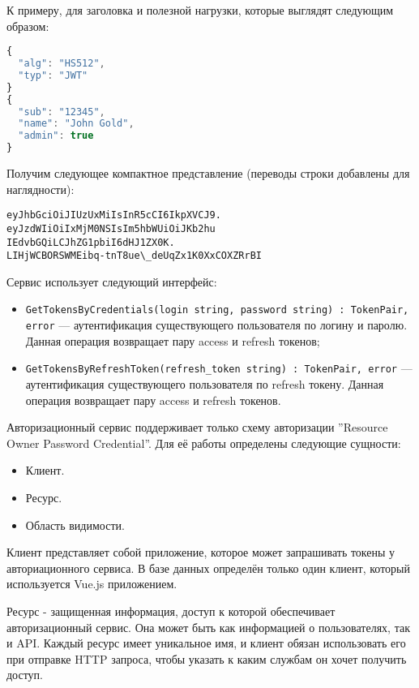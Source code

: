 К примеру, для заголовка и полезной нагрузки, которые выглядят следующим образом:

\begin{lstlisting}[language=javascript]
{
  "alg": "HS512",
  "typ": "JWT"
}
{
  "sub": "12345",
  "name": "John Gold",
  "admin": true
}
\end{lstlisting}

Получим следующее компактное представление (переводы строки добавлены для наглядности):

\begin{lstlisting}
eyJhbGciOiJIUzUxMiIsInR5cCI6IkpXVCJ9.
eyJzdWIiOiIxMjM0NSIsIm5hbWUiOiJKb2hu
IEdvbGQiLCJhZG1pbiI6dHJ1ZX0K.
LIHjWCBORSWMEibq-tnT8ue\_deUqZx1K0XxCOXZRrBI
\end{lstlisting}

Сервис использует следующий интерфейс:

\begin{itemize}
    \item \lstinline{GetTokensByCredentials(login string, password string) : TokenPair, error} — аутентификация существующего пользователя по логину и паролю. Данная операция возвращает пару access и refresh токенов;
    \item \lstinline{GetTokensByRefreshToken(refresh_token string) : TokenPair, error} — аутентификация существующего пользователя по refresh токену. Данная операция возвращает пару access и refresh токенов.
\end{itemize}

Авторизационный сервис поддерживает только схему авторизации ''Resource Owner Password Credential''. Для её работы определены следующие сущности:

\begin{itemize}
    \item Клиент.
    \item Ресурс.
    \item Область видимости.
\end{itemize}

Клиент представляет собой приложение, которое может запрашивать токены у авториационного сервиса. В базе данных определён только один клиент, который используется Vue.js приложением.

Ресурс - защищенная информация, доступ к которой обеспечивает авторизационный сервис. Она может быть как информацией о пользователях, так и API. Каждый ресурс имеет уникальное имя, и клиент обязан использовать его при отправке HTTP запроса, чтобы указать к каким службам он хочет получить доступ.

